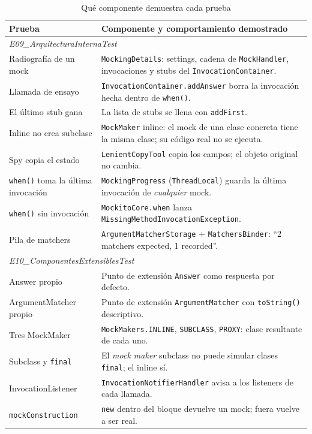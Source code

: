 \documentclass[11pt,a4paper,oneside]{report}
\newcommand{\code}[1]{\texttt{#1}}
\begin{document}
\begin{table}[H]
\centering
\caption{Qué componente demuestra cada prueba}
\small
\begin{tabularx}{\linewidth}{lX}
\toprule
\textbf{Prueba} & \textbf{Componente y comportamiento demostrado}\\
\midrule
\multicolumn{2}{l}{\textit{E09\_ArquitecturaInternaTest}}\\
Radiografía de un mock & \code{MockingDetails}: settings, cadena de \code{MockHandler}, invocaciones y stubs del \code{InvocationContainer}.\\
Llamada de ensayo & \code{InvocationContainer.addAnswer} borra la invocación hecha dentro de \code{when()}.\\
El último stub gana & La lista de stubs se llena con \code{addFirst}.\\
Inline no crea subclase & \code{MockMaker} inline: el mock de una clase concreta tiene la misma clase; su código real no se ejecuta.\\
Spy copia el estado & \code{LenientCopyTool} copia los campos; el objeto original no cambia.\\
\code{when()} toma la última invocación & \code{MockingProgress} (\code{ThreadLocal}) guarda la última invocación de \emph{cualquier} mock.\\
\code{when()} sin invocación & \code{MockitoCore.when} lanza \code{MissingMethodInvocationException}.\\
Pila de matchers & \code{ArgumentMatcherStorage} + \code{MatchersBinder}: ``2 matchers expected, 1 recorded''.\\
\midrule
\multicolumn{2}{l}{\textit{E10\_ComponentesExtensiblesTest}}\\
Answer propio & Punto de extensión \code{Answer} como respuesta por defecto.\\
ArgumentMatcher propio & Punto de extensión \code{ArgumentMatcher} con \code{toString()} descriptivo.\\
Tres MockMaker & \code{MockMakers.INLINE}, \code{SUBCLASS}, \code{PROXY}: clase resultante de cada uno.\\
Subclass y \code{final} & El \emph{mock maker} subclass no puede simular clases \code{final}; el inline sí.\\
InvocationListener & \code{InvocationNotifierHandler} avisa a los listeners de cada llamada.\\
\code{mockConstruction} & \code{new} dentro del bloque devuelve un mock; fuera vuelve a ser real.\\
\bottomrule
\end{tabularx}
\end{table}
\end{document}

